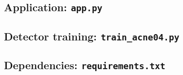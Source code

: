 \documentclass[10pt,twocolumn,letterpaper]{article}
\begin{document}
\subsection{Application: \texttt{app.py}}


\subsection{Detector training: \texttt{train\_acne04.py}}


\subsection{Dependencies: \texttt{requirements.txt}}

\end{document}
